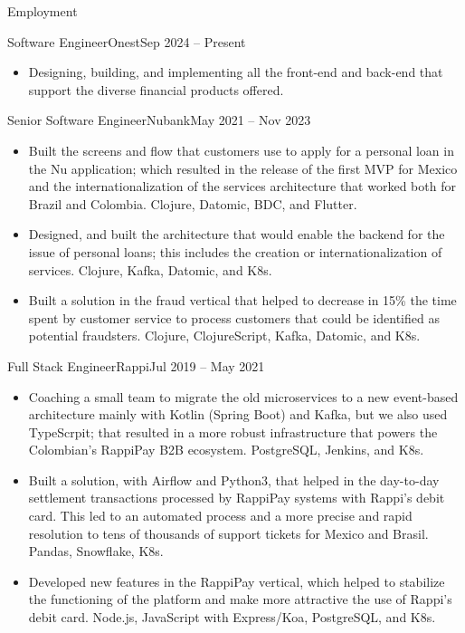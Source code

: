 \documentclass[calibri]{../macdowell-cv/mcdowellcv}
\begin{document}
	\makeheader
	
	\begin{cvsection}{Employment}
		\begin{cvsubsection}{Software Engineer}{Onest}{Sep 2024 -- Present}
			\begin{itemize}
                \item Designing, building, and implementing all the front-end
                    and back-end that support the diverse financial products
                    offered.
			\end{itemize}
		\end{cvsubsection}

		\begin{cvsubsection}{Senior Software Engineer}{Nubank}{May 2021 -- Nov 2023}
			\begin{itemize}
				\item Built the screens and flow that customers use to apply for a personal loan in the Nu application; which resulted in the release of the first MVP for Mexico and the internationalization of the services architecture that worked both for Brazil and Colombia. Clojure, Datomic, BDC, and Flutter.
				\item Designed, and built the architecture that would enable the backend for the issue of personal loans; this includes the creation or internationalization of services. Clojure, Kafka, Datomic, and K8s.
				\item Built a solution in the fraud vertical that helped to decrease in 15\% the time spent by customer service to process customers that could be identified as potential fraudsters. Clojure, ClojureScript, Kafka, Datomic, and K8s.
			\end{itemize}
		\end{cvsubsection}

		\begin{cvsubsection}{Full Stack Engineer}{Rappi}{Jul 2019 -- May 2021}
			\begin{itemize}
				\item Coaching a small team to migrate the old microservices to a new event-based architecture mainly with Kotlin (Spring Boot) and Kafka, but we also used TypeScrpit; that resulted in a more robust infrastructure that powers the Colombian's RappiPay B2B ecosystem. PostgreSQL, Jenkins, and K8s.
				\item Built a solution, with Airflow and Python3, that helped in the day-to-day settlement transactions processed by RappiPay systems with Rappi's debit card. This led to an automated process and a more precise and rapid resolution to tens of thousands of support tickets for Mexico and Brasil. Pandas, Snowflake, K8s.
				\item Developed new features in the RappiPay vertical, which helped to stabilize the functioning of the platform and make more attractive the use of Rappi's debit card. Node.js, JavaScript with Express/Koa, PostgreSQL, and K8s.
			\end{itemize}
		\end{cvsubsection}


\end{cvsection}
\end{document}
